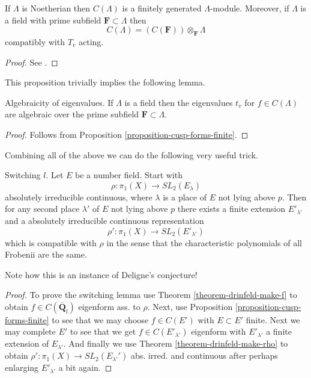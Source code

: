 \begin{proposition}
\label{proposition-cusp-forms-finite}
If $\Lambda$ is Noetherian then $C(\Lambda)$ is a
finitely generated $\Lambda$-module. Moreover, if $\Lambda$ is a field with
prime subfield $\mathbf{F} \subset \Lambda$ then
$$
C(\Lambda)=(C(\mathbf{F}))\otimes_{\mathbf{F}}\Lambda
$$
compatibly with $T_v$ acting.
\end{proposition}

\begin{proof}
See \cite[Proposition 4.7]{dJ-conjecture}.
\end{proof}

\noindent
This proposition trivially implies the following lemma.

\begin{lemma}
\label{lemma-eigenvalues-algebraic}
Algebraicity of eigenvalues.
If $\Lambda$ is a field then the eigenvalues $t_v$ for $f\in
C(\Lambda)$ are algebraic over the prime subfield
$\mathbf{F} \subset \Lambda$.
\end{lemma}

\begin{proof}
Follows from Proposition \ref{proposition-cusp-forms-finite}.
\end{proof}

\noindent
Combining all of the above we can do the following very useful trick.

\begin{lemma}
\label{lemma-switch-l}
Switching $l$. Let $E$ be a number field.
Start with
$$
\rho : \pi_1(X)\to SL_2(E_\lambda)
$$
absolutely irreducible continuous, where $\lambda$ is a place of $E$
not lying above $p$. Then for any second place $\lambda'$ of $E$
not lying above $p$ there exists a finite extension $E'_{\lambda'}$
and a absolutely irreducible continuous representation
$$
\rho': \pi_1(X)\to SL_2(E'_{\lambda'})
$$
which is compatible with $\rho$ in the sense that the characteristic
polynomials of all Frobenii are the same.
\end{lemma}

\noindent
Note how this is an instance of Deligne's conjecture!

\begin{proof}
To prove the switching lemma use
Theorem \ref{theorem-drinfeld-make-f}
to obtain $f\in C(\overline{\mathbf{Q}}_l)$ eigenform ass. to $\rho$.
Next, use
Proposition \ref{proposition-cusp-forms-finite}
to see that we may choose $f\in C(E')$ with $E \subset E'$ finite.
Next we may complete $E'$ to see that we get
$f\in C(E'_{\lambda'})$ eigenform with
$E'_{\lambda'}$ a finite extension of $E_{\lambda'}$.
And finally we use
Theorem \ref{theorem-drinfeld-make-rho}
to obtain
$\rho': \pi_1(X) \to SL_2(E_{\lambda'}')$ abs. irred. and continuous
after perhaps enlarging $E'_{\lambda'}$ a bit again.
\end{proof}

